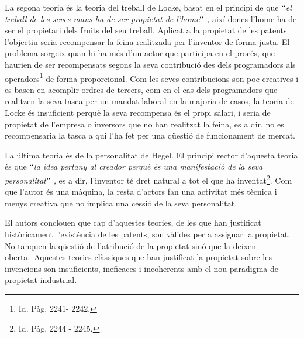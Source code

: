 \documentclass[12pt]{article}
\begin{document}
\vspace{\baselineskip}
\begin{justify}
La segona teoria és la teoria del treball de Locke, basat en el principi de que $``$\textit{el treball de les seves mans ha de ser propietat de l’home$"$ , }així doncs l’home ha de ser el propietari dels fruits del seu treball. Aplicat a la propietat de les patents l’objectiu seria recompensar la feina realitzada per l’inventor de forma justa. El problema sorgeix quan hi ha més d’un actor que participa en el procés,  que haurien de ser recompensats segons la seva contribució des dels programadors als operadors\footnote{ Id. Pàg. 2241- 2242. } de forma proporcional. Com les seves contribucions son poc creatives i es basen en acomplir ordres de tercers, com en el cas dels programadors que realitzen la seva tasca per un mandat laboral en la majoria de casos, la teoria de Locke és insuficient perquè la seva recompensa és el propi salari, i seria de propietat de l’empresa o inversors que no han realitzat la feina, es a dir, no es recompensaria la tasca a qui l’ha fet per una qüestió de funcionament de mercat. 
\end{justify}\par


\vspace{\baselineskip}
\begin{justify}
La última teoria és de la personalitat de Hegel. El principi rector d’aquesta teoria és que \textit{$``$la idea pertany al creador perquè és una manifestació de la seva personalitat$"$ , }es a dir, l’inventor té dret natural a tot el que ha inventat\footnote{ Id. Pàg. 2244 - 2245. }. Com que l’autor és una màquina, la resta d’actors fan una activitat més tècnica i menys creativa que no implica una cessió de la seva personalitat.  
\end{justify}\par


\vspace{\baselineskip}
\begin{justify}
El autors conclouen que cap d’aquestes teories, de les que han justificat històricament l’existència de les patents, son vàlides per a assignar la propietat. No tanquen la qüestió  de l’atribució de la propietat sinó que la deixen oberta.\  Aquestes teories clàssiques que han justificat la propietat sobre les invencions son insuficients, ineficaces  i incoherents amb el nou paradigma de propietat industrial. 
\end{justify}\par
\end{document}
